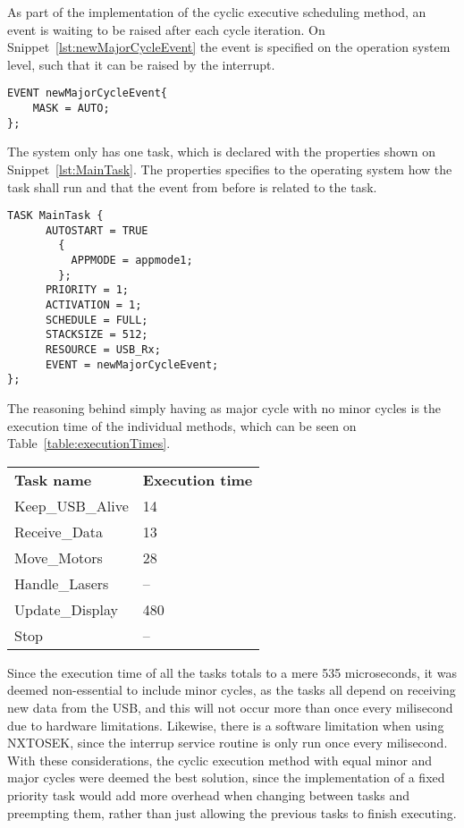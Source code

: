 As part of the implementation of the cyclic executive scheduling method, an event is waiting to be raised after each cycle iteration. 
On Snippet~\ref{lst:newMajorCycleEvent} the event is specified on the operation system level, such that it can be raised by the interrupt. 
\begin{lstlisting}[language=CSharp,label={lst:newMajorCycleEvent},caption={newMajorCycleEvent event from nxt.oil}]
EVENT newMajorCycleEvent{
    MASK = AUTO;
};
\end{lstlisting}

The system only has one task, which is declared with the properties shown on Snippet~\ref{lst:MainTask}. 
The properties specifies to the operating system how the task shall run and that the event from before is related to the task.
\begin{lstlisting}[language=CSharp,label={lst:MainTask},caption={MainTaks task from nxt.oil}]
    TASK MainTask {
      AUTOSTART = TRUE 
        {
          APPMODE = appmode1;
        };
      PRIORITY = 1;
      ACTIVATION = 1;
      SCHEDULE = FULL;
      STACKSIZE = 512;
      RESOURCE = USB_Rx;
      EVENT = newMajorCycleEvent;
};
\end{lstlisting}

The reasoning behind simply having as major cycle with no minor cycles is the execution time of the individual methods, which can be seen on Table~\ref{table:executionTimes}.

\begin{table}[]
\begin{tabular}{ll}
\textbf{Task name}  & \textbf{Execution time} \\
Keep\_USB\_Alive    & 14                            \\
Receive\_Data       & 13                            \\
Move\_Motors        & 28                            \\
Handle\_Lasers      & --                            \\
Update\_Display     & 480                           \\
Stop                & --                            
\end{tabular}
\end{table}\label{table:executionTimes}

Since the execution time of all the tasks totals to a mere 535 microseconds, it was deemed non-essential to include minor cycles, as the tasks all depend on receiving new data from the USB, and this will not occur more than once every milisecond due to hardware limitations.
Likewise, there is a software limitation when using NXTOSEK, since the interrup service routine is only run once every milisecond.
With these considerations, the cyclic execution method with equal minor and major cycles were deemed the best solution, since the implementation of a fixed priority task would add more overhead when changing between tasks and preempting them, rather than just allowing the previous tasks to finish executing.

